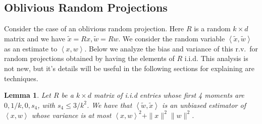 \documentclass{article}
\newtheorem{lemma}[theorem]{Lemma}
\theoremstyle{definition}
\theoremstyle{plain}
\newcommand{\ip}[1]{\left \langle #1 \right \rangle}
\begin{document}
\subsection{Oblivious Random Projections}
Consider the case of an oblivious random projection. Here $R$ is a random $k \times d$ matrix and we have $\tilde{x} = Rx, \tilde{w} = Rw$. We consider the random variable $\ip{\tilde{x}, \tilde{w}}$ as an estimate to $\ip{x,w}$. Below we analyze the bias and variance of this r.v.\ for random projections obtained by having the elements of $R$ i.i.d. This analysis is not new, but it's details will be useful in the following sections for explaining are techniques.

\begin{lemma}
Let $R$ be a $k \times d$ matrix of i.i.d entries whose first 4 moments are $0,1/k,0,s_4$, with $s_4 \leq 3/k^2$. We have that $\ip{\tilde{w},\tilde{x}}$ is an unbiased estimator of $\ip{x,w}$ whose variance is at most $\ip{x,w}^2 + \|x\|^2\|w\|^2$.
\end{lemma}
\end{document}
